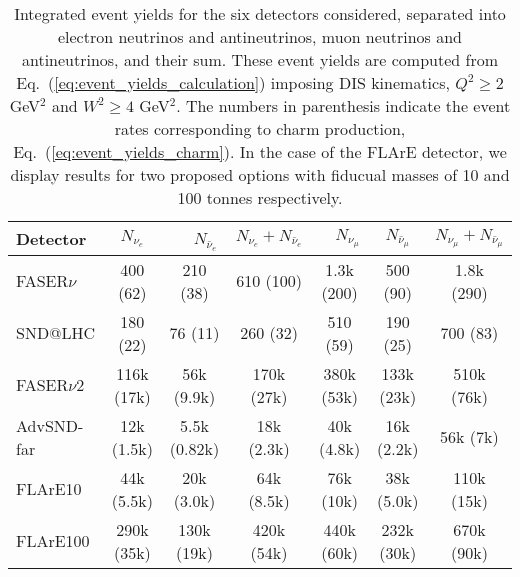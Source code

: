 \begin{table*}[t]
  \centering
  \small
  \renewcommand{\arraystretch}{1.70}
\begin{tabularx}{\textwidth}{X||c|c|c||c|c|c}
\toprule
Detector & $\quad$ $N_{\nu_e}$ $\quad$ &$\quad$ $N_{\bar{\nu}_e}$$\quad$   &   $N_{\nu_e} + N_{\bar{\nu}_e}$ &
$\quad$$N_{\nu_\mu}$ $\quad$ & $\quad$ $N_{\bar{\nu}_\mu}$ $\quad$  &   $N_{\nu_\mu} + N_{\bar{\nu}_\mu}$ \\
\midrule
\midrule
FASER$\nu$  & 400 (62)    & 210 (38)  & 610 (100)  &  1.3k (200)  &  500 (90)  &  1.8k (290) \\
SND@LHC  &  180 (22)  & 76 (11)    & 260 (32)   &  510 (59) & 190 (25)   &  700  (83)\\
\midrule
\midrule
FASER$\nu$2  & 116k (17k)   & 56k (9.9k)   & 170k (27k)  & 380k (53k)  & 133k (23k)    & 510k (76k)   \\
AdvSND-far  &  12k (1.5k)  & 5.5k (0.82k)   & 18k (2.3k)  & 40k (4.8k)  & 16k (2.2k)   & 56k (7k)   \\
FLArE10 & 44k (5.5k) & 20k (3.0k)   &  64k (8.5k) &  76k (10k)&   38k (5.0k) &   110k (15k) \\
FLArE100 &   290k (35k)         &    130k (19k)         &       420k (54k)       &   440k (60k)      &  232k (30k)    &  670k (90k)  \\
  \bottomrule
\end{tabularx}
\vspace{0.2cm}
\caption{\small Integrated event yields for the six detectors considered,
  separated into electron neutrinos and antineutrinos,
  muon neutrinos and antineutrinos, and their sum.
  These event yields are computed from Eq.~(\ref{eq:event_yields_calculation})
  imposing DIS kinematics, $Q^2 \ge 2$ GeV$^2$ and $W^2 \ge 4$ GeV$^2$.
 The numbers in parenthesis indicate the event rates corresponding to charm
 production, Eq.~(\ref{eq:event_yields_charm}).
 In the case of the FLArE detector, we display results for two proposed
 options with fiducual masses of 10 and 100 tonnes respectively.
  \label{tab:integrated_rates}
}
\end{table*}
